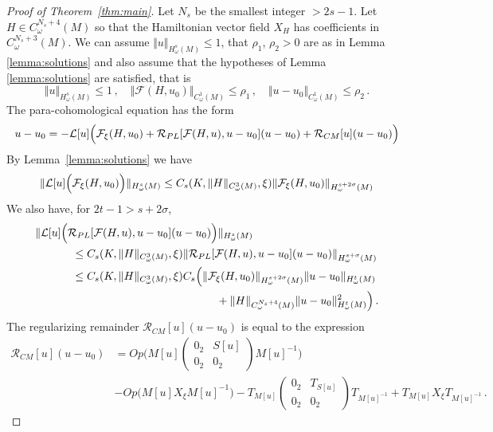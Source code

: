 \documentclass[11pt]{amsart}
\begin{document}
\begin{proof} [Proof of Theorem~\ref{thm:main}]
Let  $N_s$ be the smallest integer $>2s-1$. Let $H \in C^{N_s+4}_\omega(M)$ so that the Hamiltonian vector field $X_H$ has coefficients in $C^{N_s+3}_\omega(M)$.  We can assume $\Vert u \Vert_{H^s_\omega(M)} \leq 1$, that  $\rho_1$, $\rho_2>0$ are as in Lemma \ref{lemma:solutions}
and also assume that the hypotheses of Lemma \ref{lemma:solutions} are satisfied, that is
\begin{equation}
\label{eq:apriori_conditions}
\Vert u \Vert_{H^s_\omega(M)} \leq 1\,, \quad  \Vert \mathcal F (H, u_0) \Vert_{C^1_\omega(M)} \leq \rho_1\,, \quad  \Vert u-u_0\Vert _{C^1_\omega(M)} \leq \rho_2 \,.
\end{equation}
The para-cohomological equation has the form
$$
u-u_0 = - \mathcal{L}[u] \Bigl (\mathcal{F}_\xi(H, u_0) +  \mathcal R_{PL}[\mathcal F (H, u), u-u_0 ] (u-u_0) + \mathcal R_{CM}[u] (u-u_0)   \Big)
$$
By Lemma~\ref{lemma:solutions}  we have
$$
\Vert  \mathcal{L}[u] \Bigl (\mathcal{F}_\xi(H, u_0) \Big) \Vert_{H^s_\omega(M)} \leq C_s (K, \Vert H\Vert_{C^3_\omega(M)}, \xi) \Vert  \mathcal{F}_\xi(H, u_0)  \Vert_{H^{s+2\sigma}_\omega(M)} 
$$
We also have, for $2t-1 >  s+ 2\sigma$, 
$$
\begin{aligned}
\Vert \mathcal{L}[u] &\Bigl ( \mathcal R_{PL}[\mathcal F (H, u), u-u_0 ] (u-u_0) \Big)\Vert_{H^s_\omega(M)}  \\&\quad \leq C_s (K, \Vert H\Vert_{C^3_\omega(M)}, \xi) \Vert 
\mathcal R_{PL}[\mathcal F (H, u), u-u_0 ] (u-u_0) \Vert_{H^{s+ \sigma}_\omega(M)}  \\ &\quad \leq  C_s (K, \Vert H\Vert_{C^3_\omega(M)}, \xi) C_s 
\Big(  \Vert  \mathcal{F}_\xi(H, u_0)  \Vert_{H^{s+2\sigma}_\omega(M)}  \Vert u-u_0 \Vert_{H^t_\omega(M)}  \\ & \qquad \qquad\qquad\qquad \qquad\qquad \qquad+ \Vert H \Vert_{C^{N_s+4}_\omega(M)}  \Vert u-u_0 \Vert_{H^t_\omega(M)} ^2\Big)\,.
\end{aligned}
$$
The regularizing remainder  $\mathcal R_{CM}[u] (u-u_0)$ is equal to the expression 
$$
\begin{aligned}
\mathcal R_{CM}[u] (u-u_0)&=  Op \Big( M[u] \begin{pmatrix} 0_2 & S[u] \\ 0_2 & 0_2 \end{pmatrix} M[u]^{-1}  \Big) \\ & -  Op\big(M[u] X_\xi M[u]^{-1} \Big)
- T_{M[u]} \begin{pmatrix} 0_2 & T_{S[u]} \\ 0_2 & 0_2 \end{pmatrix} T_{M[u]^{-1}}  + T_{M[u]} X_\xi T_{M[u]^{-1}}\,.

\end{aligned}$$
\end{proof}
\end{document}
